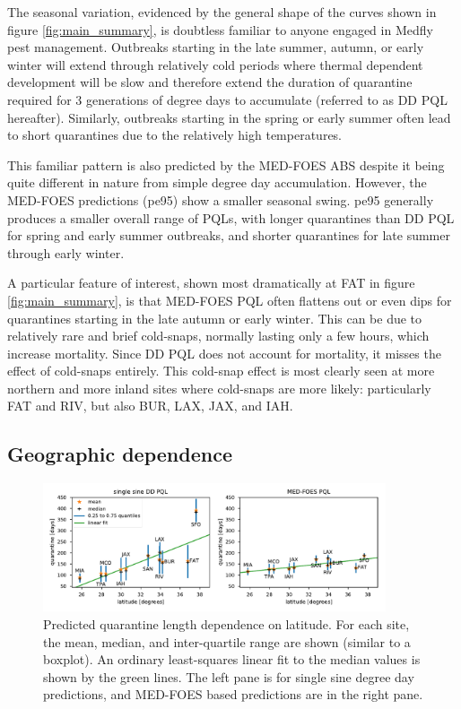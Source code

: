 \documentclass[10pt,a4paper,twocolumn]{article}
\begin{document}
The seasonal variation, evidenced by the general shape of the curves shown in figure \ref{fig:main_summary}, 
is doubtless familiar to anyone engaged in Medfly pest management.
Outbreaks starting in the late summer, autumn, or early winter will extend through relatively cold periods
where thermal dependent development will be slow and therefore extend the duration of quarantine required
for 3 generations of degree days to accumulate (referred to as DD PQL hereafter).
Similarly, outbreaks starting in the spring or early summer often lead to short quarantines due
to the relatively high temperatures.

This familiar pattern is also predicted by the MED-FOES ABS despite it being 
quite different in nature from simple degree day accumulation.
However, the MED-FOES predictions (pe95) show a smaller seasonal swing.
pe95 generally produces a smaller overall range of PQLs,
with longer quarantines than DD PQL for spring and early summer outbreaks,
and shorter quarantines for late summer through early winter.

A particular feature of interest, shown most dramatically at FAT in figure \ref{fig:main_summary},
is that MED-FOES PQL often flattens out or even dips for quarantines starting in the late 
autumn or early winter.  This can be due to relatively rare and brief cold-snaps,
normally lasting only a few hours, which increase mortality.
Since DD PQL does not account for mortality, it misses the effect of cold-snaps entirely.
This cold-snap effect is most clearly seen at more northern and 
more inland sites where cold-snaps are more likely: 
particularly FAT and RIV, but also BUR, LAX, JAX, and IAH.

\subsection*{Geographic dependence}

\begin{figure}[ht!]
\centering
\includegraphics[width=0.9\textwidth]{figs/fig_latitude_trend_withSFO.pdf}
\caption{\label{fig:latitude_trend} Predicted quarantine length dependence on latitude.
For each site, the mean, median, and inter-quartile range are shown (similar to a boxplot).
An ordinary least-squares linear fit to the median values is shown by the green lines.
The left pane is for single sine degree day predictions,
and MED-FOES based predictions are in the right pane.
}
\end{figure}
\end{document}
